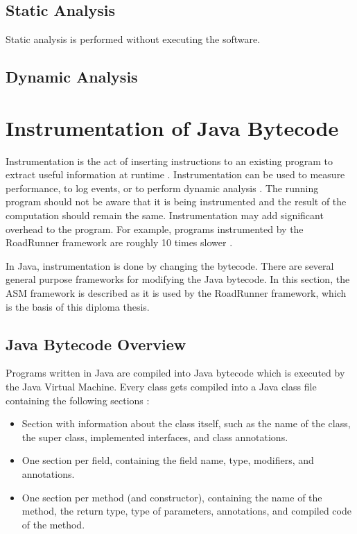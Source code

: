 \subsection{Static Analysis}

Static analysis is performed without executing the software.

\todo{}

\subsection{Dynamic Analysis}

\todo{}


\section{Instrumentation of Java Bytecode}

Instrumentation is the act of inserting instructions to an existing program to
extract useful information at runtime . Instrumentation
can be used to measure performance, to log events, or to perform dynamic
analysis . The running program should not be aware that it
is being instrumented and the result of the computation should remain the same.
Instrumentation may add significant overhead to the program. For example,
programs instrumented by the RoadRunner framework are roughly 10 times slower
\cite{RoadRunner}.

In Java, instrumentation is done by changing the bytecode. There are several
general purpose frameworks for modifying the Java bytecode. In this section, the
ASM framework is described as it is used by the RoadRunner framework, which is
the basis of this diploma thesis.

\subsection{Java Bytecode Overview}

Programs written in Java are compiled into Java bytecode which is executed by
the Java Virtual Machine. Every class gets compiled into a Java class file
containing the following sections \cite{asmguide}:
\begin{itemize}
    \item Section with information about the class itself, such as the name of
    the class, the super class, implemented interfaces, and class annotations.
    \item One section per field, containing the field name, type, modifiers, and
    annotations.
    \item One section per method (and constructor), containing the name of the
    method, the return type, type of parameters, annotations, and compiled code
    of the method.
\end{itemize}


